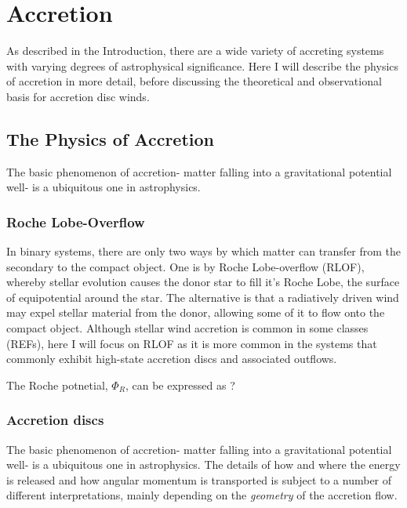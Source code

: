 \chapter{Accretion}


As described in the Introduction, there are a wide variety of accreting systems
with varying degrees of astrophysical significance. Here I will describe the 
physics of accretion in more detail, before discussing the theoretical and observational 
basis for accretion disc winds. 

\section{The Physics of Accretion}

The basic phenomenon of accretion- matter falling into a gravitational potential well- 
is a ubiquitous one in astrophysics. 


\subsection{Roche Lobe-Overflow}

In binary systems, there are only two ways by which matter can transfer 
from the secondary to the compact object. One is by Roche Lobe-overflow (RLOF),
whereby stellar evolution causes the donor star to fill it's Roche Lobe, the surface
of equipotential around the star. The alternative is that a radiatively driven wind
may expel stellar material from the donor, allowing some of it to flow onto the compact object.
Although stellar wind accretion is common in some classes (REFs), here I will focus on 
RLOF as it is more common in the systems that commonly exhibit high-state accretion discs
and associated outflows.

The Roche potnetial, $\Phi_R$, can be expressed as ?



\subsection{Accretion discs}

The basic phenomenon of accretion- matter falling into a gravitational potential well- 
is a ubiquitous one in astrophysics. The details of how and where the energy is released
and how angular momentum is transported is subject to a number of different 
interpretations, mainly depending on the {\em geometry} of the accretion flow.





